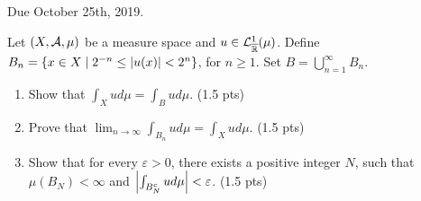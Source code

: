 Due October 25th, 2019.

\begin{ex}
	Let $(X, \mathcal{A}, \mu)$ be a measure space and $u \in \mathcal{L}^1_{\overline{\mathbb{R}}}(\mu)$. Define $B_n = \{ x \in X \mid 2^{-n} \leq \left\vert{u(x)}\right\vert < 2^n\}$, for $n \geq 1$. Set $B = \bigcup_{n = 1}^\infty B_n$.
	
	\begin{enumerate}
		\item Show that $\int_X u d\mu = \int_B u d\mu$. (1.5 pts)
		\item Prove that $\lim_{n \to \infty} \int_{B_n} u d\mu = \int_X u d\mu$. (1.5 pts)
		\item Show that for every $\varepsilon > 0$, there exists a positive integer $N$, such that $\mu(B_N) < \infty$ and $\left\vert{\int_{B_N^c} ud\mu}\right\vert < \varepsilon$. (1.5 pts)
	\end{enumerate}
\end{ex}

